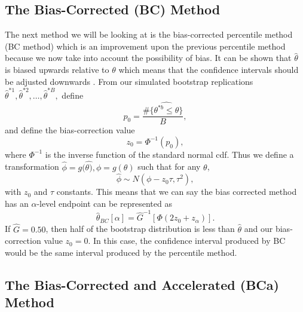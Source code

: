 \documentclass[12pt]{article}
\begin{document}
\hypertarget{the-bias-corrected-bc-method}{%
\subsection{The Bias-Corrected (BC)
Method}\label{the-bias-corrected-bc-method}}

The next method we will be looking at is the bias-corrected percentile
method (BC method) which is an improvement upon the previous percentile
method because we now take into account the possibility of bias. It can
be shown that \(\hat{\theta}\) is biased upwards relative to \(\theta\)
which means that the confidence intervals should be adjusted downwards
\citep[\citet{EfronCasi}]{Efron86}. From our simulated bootstrap
replications
\(\hat{\theta}^{*1}, \hat{\theta}^{*2}, \dots ,\hat{\theta}^{*B},\)
define \[p_0 = \frac{\#\{\hat{\theta^{*b} \leq \theta}\}}{B},\] and
define the bias-correction value \[z_0 = \Phi^{-1}(p_0),\] where
\(\Phi^{-1}\) is the inverse function of the standard normal cdf. Thus
we define a transformation
\(\hat{\phi} = g(\hat{\theta)}, \phi = g(\theta)\) such that for any
\(\theta\), \[\hat{\phi} \sim N(\phi - z_0\tau, \tau^2),\] with \(z_0\)
and \(\tau\) constants. This means that we can say the bias corrected
method has an \(\alpha\)-level endpoint can be represented as
\[\hat{\theta}_{BC}[\alpha] = \hat{G}^{-1} \left [ \Phi \left ( 2z_0 + z_\alpha\right ) \right ].\]
If \(\hat{G} = 0.50\), then half of the bootstrap distribution is less
than \(\hat{\theta}\) and our bias-correction value \(z_0 = 0\). In this
case, the confidence interval produced by BC would be the same interval
produced by the percentile method.

\hypertarget{the-bias-corrected-and-accelerated-bca-method}{%
\subsection{The Bias-Corrected and Accelerated (BCa)
Method}\label{the-bias-corrected-and-accelerated-bca-method}}
\end{document}
